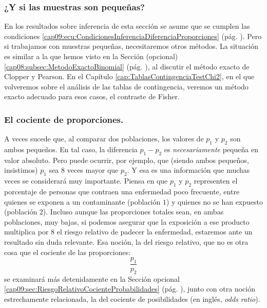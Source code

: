 \subsubsection*{¿Y si las muestras son pequeñas?}

En los resultados sobre inferencia de esta sección se asume que se cumplen las condiciones \ref{cap09:ecu:CondicionesInferenciaDiferenciaProporciones} (pág. \pageref{cap09:ecu:CondicionesInferenciaDiferenciaProporciones}). Pero si trabajamos con muestras pequeñas,  necesitaremos otros métodos. La situación es similar a la que hemos visto en la Sección (opcional) \ref{cap08:subsec:MetodoExactoBinomial} (pág. \pageref{cap08:subsec:MetodoExactoBinomial}), al discutir el método exacto de Clopper y Pearson. En el Capítulo \ref{cap:TablasContingenciaTestChi2}, en el que volveremos sobre el análisis de las tablas de contingencia, veremos un  método exacto adecuado para esos casos, el {\sf contraste de Fisher}.

\subsubsection*{El cociente de proporciones.}

A veces sucede que, al comparar dos poblaciones, los valores de $p_1$ y $p_2$ son ambos pequeños. En tal caso, la diferencia $p_1-p_2$ es {\em necesariamente} pequeña en valor absoluto. Pero puede ocurrir, por ejemplo, que (siendo ambos pequeños, insistimos) $p_1$ sea $8$ veces mayor que $p_2$. Y esa es una información que muchas veces se considerará muy importante. Piensa en que $p_1$ y $p_2$ representen el porcentaje de personas que contraen una enfermedad poco frecuente, entre quienes se exponen a un  contaminante (población $1$) y quienes no se han expuesto (población $2$). Incluso aunque las proporciones totales sean, en ambas poblaciones, muy bajas, si podemos asegurar que la exposición a ese producto multiplica por $8$ el {\sf riesgo relativo} de padecer la enfermedad, estaremos ante un resultado sin duda relevante. Esa noción, la del riesgo relativo, que no es otra cosa que el cociente de las proporciones:
\[\frac{p_1}{p_2}\]
se examinará más detenidamente en la Sección opcional \ref{cap09:sec:RiesgoRelativoCocienteProbabilidades} (pág. \pageref{cap09:sec:RiesgoRelativoCocienteProbabilidades}), junto con otra noción estrechamente relacionada, la del cociente de posibilidades (en inglés, {\em odds ratio}).

